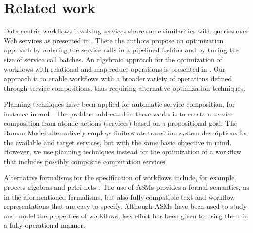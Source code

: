 
\section{Related work} \label{sec:relatedWork}

Data-centric workflows involving services share some similarities with queries over Web services as presented in \cite{Srivastava:2006:QOO:1182635.1164159}. There the authors propose an optimization approach by ordering the service calls in a pipelined fashion and by tuning the size of service call batches. An algebraic approach for the optimization of workflows with relational and map-reduce operations is presented in \cite{DBLP:journals/pvldb/OgasawaraOVDPM11}. Our approach is to enable workflows with a broader variety of operations defined through service compositions, thus requiring alternative optimization techniques.

Planning techniques have been applied for automatic service composition, for instance in \cite{DBLP:conf/kr/McIlraithS02} and \cite{Sirin:2004:HPW:1741306.1741331}. The problem addressed in those works is to create a service composition from atomic actions (services) based on a propositional goal. The Roman Model \cite{DBLP:journals/debu/CalvaneseGLMP08} alternatively employs finite state transition system descriptions for the available and target services, but with the same basic objective in mind. However, we use planning techniques instead for the optimization of a workflow that includes possibly composite computation services.

Alternative formalisms for the specification of workflows include, for example, process algebras \cite{Curcin:2011:STW:2048456.2048467} and petri nets \cite{Hidders:2008:DDL:1340791.1340907}. The use of ASMs provides a formal semantics, as in the aformentioned formalisms, but also fully compatible text and workflow representations that are easy to specify. Although ASMs have been used to study and model the properties of workflows, less effort has been given to using them in a fully operational manner.

